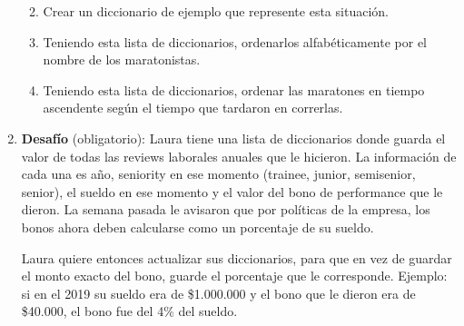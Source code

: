 \documentclass[
  letterpaper,
  DIV=11,
  numbers=noendperiod]{scrreprt}
\providecommand{\tightlist}{%
  \setlength{\itemsep}{0pt}\setlength{\parskip}{0pt}}\usepackage{longtable,booktabs,array}
\begin{document}
\begin{enumerate}
  \begin{enumerate}
  \def\labelenumii{\alph{enumii}.}
  \tightlist
  \item
    Crear un diccionario de ejemplo que represente esta situación.
  \item
    Teniendo esta lista de diccionarios, ordenarlos alfabéticamente por
    el nombre de los maratonistas.
  \item
    Teniendo esta lista de diccionarios, ordenar las maratones en tiempo
    ascendente según el tiempo que tardaron en correrlas.
  \end{enumerate}
\item
  \textbf{Desafío} (obligatorio): Laura tiene una lista de diccionarios
  donde guarda el valor de todas las reviews laborales anuales que le
  hicieron. La información de cada una es año, seniority en ese momento
  (trainee, junior, semisenior, senior), el sueldo en ese momento y el
  valor del bono de performance que le dieron. La semana pasada le
  avisaron que por políticas de la empresa, los bonos ahora deben
  calcularse como un porcentaje de su sueldo.

  Laura quiere entonces actualizar sus diccionarios, para que en vez de
  guardar el monto exacto del bono, guarde el porcentaje que le
  corresponde. Ejemplo: si en el 2019 su sueldo era de \$1.000.000 y el
  bono que le dieron era de \$40.000, el bono fue del 4\% del sueldo.


\end{enumerate}
\end{document}
